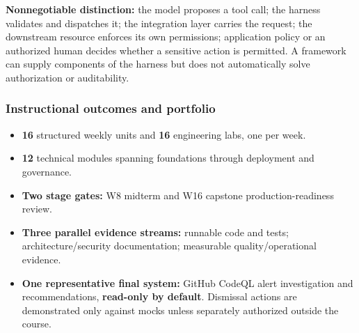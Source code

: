 \documentclass[
  10pt,
]{article}
\providecommand{\tightlist}{%
  \setlength{\itemsep}{0pt}\setlength{\parskip}{0pt}}
\begin{document}
\textbf{Nonnegotiable distinction:} the model proposes a tool call; the
harness validates and dispatches it; the integration layer carries the
request; the downstream resource enforces its own permissions;
application policy or an authorized human decides whether a sensitive
action is permitted. A framework can supply components of the harness
but does not automatically solve authorization or auditability.

\subsubsection{Instructional outcomes and
portfolio}\label{instructional-outcomes-and-portfolio}

\begin{itemize}
\tightlist
\item
  \textbf{16} structured weekly units and \textbf{16} engineering labs,
  one per week.
\item
  \textbf{12} technical modules spanning foundations through deployment
  and governance.
\item
  \textbf{Two stage gates:} W8 midterm and W16 capstone
  production-readiness review.
\item
  \textbf{Three parallel evidence streams:} runnable code and tests;
  architecture/security documentation; measurable quality/operational
  evidence.
\item
  \textbf{One representative final system:} GitHub CodeQL alert
  investigation and recommendations, \textbf{read-only by default}.
  Dismissal actions are demonstrated only against mocks unless
  separately authorized outside the course.
\end{itemize}
\end{document}

